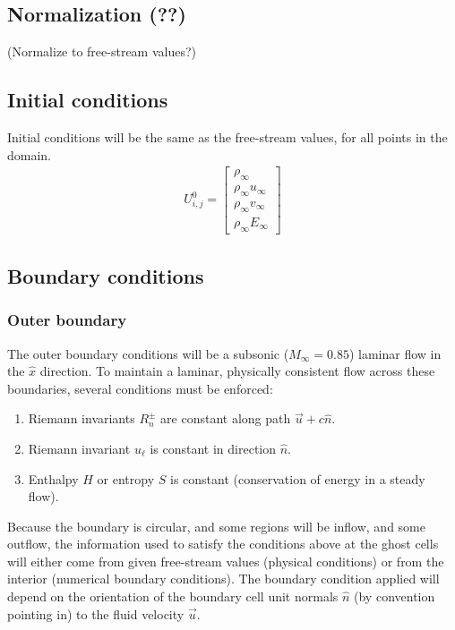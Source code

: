 \documentclass[11pt]{article}
\begin{document}
	\subsection{Normalization (??)}
	(Normalize to free-stream values?)
	
	\subsection{Initial conditions}
	Initial conditions will be the same as the free-stream values, for all points in the domain.
		\begin{align}
		U_{i,j}^0 = \begin{bmatrix}
		\rho_\infty \\ \rho_\infty u_\infty \\ \rho_\infty v_\infty \\ \rho_\infty E_\infty
		\end{bmatrix}
		\end{align}
	
	\subsection{Boundary conditions}
		\subsubsection{Outer boundary}
		The outer boundary conditions will be a subsonic ($M_\infty=0.85$) laminar flow in the $\hat{x}$ direction. To maintain a laminar, physically consistent flow across these boundaries, several conditions must be enforced:
			\begin{enumerate}
				\item Riemann invariants $R_n^\pm$ are constant along path $\vec{u} + c\hat{n}$.
				\item Riemann invariant $u_\ell$ is constant in direction $\hat{n}$.
				\item Enthalpy $H$ or entropy $S$ is constant (conservation of energy in a steady flow).
			\end{enumerate}
			
		 Because the boundary is circular, and some regions will be inflow, and some outflow, the information used to satisfy the conditions above at the ghost cells will either come from given free-stream values (physical conditions) or from the interior (numerical boundary conditions).  The boundary condition applied will depend on the orientation of the boundary cell unit normals $\hat{n}$ (by convention pointing in) to the fluid velocity $\vec{u}$.
		
\end{document}
